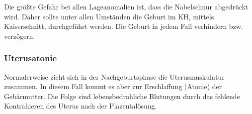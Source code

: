 Die größte Gefahr bei allen Lageanomalien ist, dass die Nabelschnur abgedrückt
wird. Daher sollte unter allen Umständen die Geburt im KH, mittels Kaiserschnitt,
durchgeführt werden. Die Geburt in jedem Fall verhindern bzw. verzögern.


% 
% 
% 
% 
% 
% 
% 
% 
% 

\subsubsection{Uterusatonie}


Normalerweise zieht sich in der Nachgeburtsphase die Uterusmuskulatur zusammen. In diesem Fall kommt es aber zur Erschlaffung (Atonie) der Gebärmutter. Die Folge sind lebensbedrohliche Blutungen durch das fehlende Kontrahieren des Uterus nach der Plazentalösung.


% 
% 
% 


